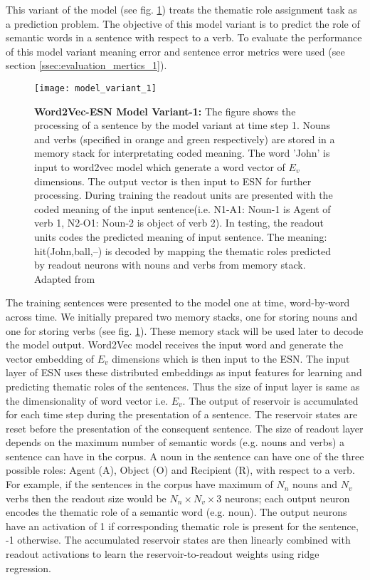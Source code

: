 This variant of the model (see fig. \ref{fig:model_variant_1}) treats the thematic role assignment task as a prediction problem. The objective of this model variant is to predict the role of semantic words in a sentence with respect to a verb. To evaluate the performance of this model variant meaning error and sentence error metrics were used (see section \ref{ssec:evaluation_mertics_1}).

\begin{figure}[hbtp]
\centering
\texttt{[image: model\_variant\_1]}
\caption{\textbf{Word2Vec-ESN Model Variant-1:} The figure shows the processing of a sentence by the model variant at time step 1. Nouns and verbs (specified in orange and green respectively) are stored in a memory stack for interpretating coded meaning. The word 'John' is input to word2vec model which generate a word vector of $E_{v}$ dimensions. The output vector is then input to ESN for further processing. During training the readout units are presented with the coded meaning of the input sentence(i.e. N1-A1: Noun-1 is Agent of verb 1, N2-O1: Noun-2 is object of verb 2). In testing, the readout units codes the predicted meaning of input sentence. The meaning: hit(John,ball,--) is decoded by mapping the thematic roles predicted by readout neurons with nouns and verbs from memory stack. Adapted from \cite{xavier:2013:RT}} 
\label{fig:model_variant_1}
\end{figure}

The training sentences were presented to the model one at time, word-by-word across time. We initially prepared two memory stacks, one for storing nouns and one for storing verbs (see fig. \ref{fig:model_variant_1}). These memory stack will be used later to decode the model output. Word2Vec model receives the input word and generate the vector embedding of $E_{v}$ dimensions which is then input to the ESN. The input layer of ESN uses these distributed embeddings as input features for learning and predicting thematic roles of the sentences. Thus the size of input layer is same as the dimensionality of word vector i.e. $E_{v}$. The output of reservoir is accumulated for each time step during the presentation of a sentence. The reservoir states are reset before the presentation of the consequent sentence. The size of readout layer depends on the maximum number of semantic words (e.g. nouns and verbs) a sentence can have in the corpus. A noun in the sentence can have one of the three possible roles: Agent (A), Object (O) and Recipient (R), with respect to a verb. For example, if the sentences in the corpus have maximum of $N_{n}$ nouns and $N_{v}$ verbs then the readout size would be $N_{n} \times N_{v} \times {3}$  neurons; each output neuron encodes the thematic role of a semantic word (e.g. noun). The output neurons have an activation of 1 if corresponding thematic role is present for the sentence, -1 otherwise. The accumulated reservoir states are then linearly combined with readout activations to learn the reservoir-to-readout weights using ridge regression.

